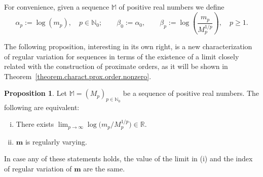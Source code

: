 \documentclass[11pt,a4paper]{article}
\theoremstyle{definition}
\newtheorem{pro}[theo]{Proposition}
\newenvironment{prop}{\smallskip\begin{pro}}{\end{pro}\smallskip}
\def\a{\alpha}
\def\b{\beta}
\def\N{\mathbb{N}}
\def\R{\mathbb{R}}
\def\M{\mathbb{M}}
\def\m{\boldsymbol{m}}
\begin{document}
For convenience, given a sequence $\M$ of positive real numbers we define
\begin{equation}\label{equaDefiAlfaBeta}
\a_p:=\log(m_p),\quad p\in\N_0; \qquad \b_0:=\a_0, \qquad \b_p:=\log\left(\frac{m_p}{M^{1/p}_p}\right), \quad p\geq1.
\end{equation}

The following proposition, interesting in its own right, is a new characterization of regular variation for sequences in terms of the existence of a limit closely related
with the construction of proximate orders, as it will be shown in Theorem~\ref{theorem.charact.prox.order.nonzero}.



\begin{prop}\label{prop.beta.regularvariation.bis}
 Let $\M=(M_p)_{p\in\N_0}$ be a sequence of positive real numbers.
 The following are equivalent:
\begin{enumerate}[(i)]
 \item There exists $\lim_{p\to\infty} \log\big(m_p/M_p^{1/p}\big)\in\R$.
 \item $\m$ is regularly varying.
\end{enumerate}
In case any of these statements holds, the value of the limit in (i) and the index of regular variation of $\m$ are the same.
\end{prop}
\end{document}
